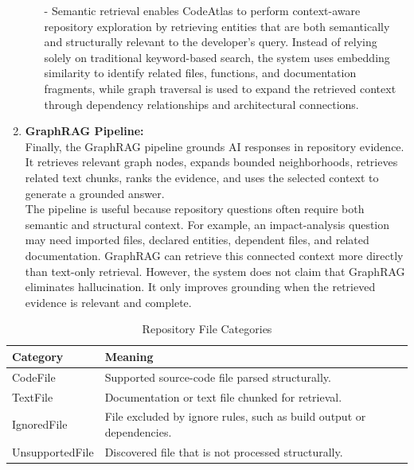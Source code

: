 \documentclass[conference]{IEEEtran}
\begin{document}
\begin{enumerate}
\begin{itemize}
        \item [-] Semantic retrieval enables CodeAtlas to perform context-aware repository exploration by retrieving entities that are both semantically and structurally relevant to the developer’s query. Instead of relying solely on traditional keyword-based search, the system uses embedding similarity to identify related files, functions, and documentation fragments, while graph traversal is used to expand the retrieved context through dependency relationships and architectural connections.\\
    \end{itemize}

    
    \item \textbf{GraphRAG Pipeline:}\\
    Finally, the GraphRAG pipeline grounds AI responses in repository evidence. It retrieves relevant graph nodes, expands bounded neighborhoods, retrieves related text chunks, ranks the evidence, and uses the selected context to generate a grounded answer.\\

    The pipeline is useful because repository questions often require both semantic and structural context. For example, an impact-analysis question may need imported files, declared entities, dependent files, and related documentation. GraphRAG can retrieve this connected context more directly than text-only retrieval. However, the system does not claim that GraphRAG eliminates hallucination. It only improves grounding when the retrieved evidence is relevant and complete.

   
\end{enumerate}


\begin{table}[h]
\caption{Repository File Categories}
\label{tab:filecategories}
\centering
\begin{tabularx}{\columnwidth}{lY}
\toprule
\textbf{Category} & \textbf{Meaning} \\
\midrule
CodeFile & Supported source-code file parsed structurally. \\
TextFile & Documentation or text file chunked for retrieval. \\
IgnoredFile & File excluded by ignore rules, such as build output or dependencies. \\
UnsupportedFile & Discovered file that is not processed structurally. \\
\bottomrule
\end{tabularx}
\end{table}
\end{document}
